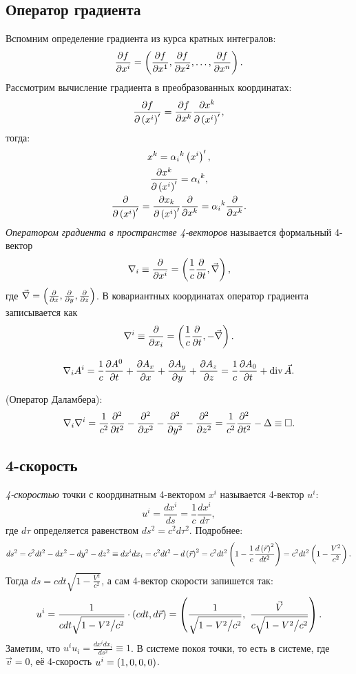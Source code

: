 \subsection{Оператор градиента}
    Вспомним определение градиента из курса кратных интегралов:
    \[
        \frac{\partial f}{\partial x^i} = \left({\frac{\partial f}{\partial x^1}, \frac{\partial f}{\partial x^2}, \ldots, \frac{\partial f}{\partial x^n}}\right).
    \]
    Рассмотрим вычисление градиента в преобразованных координатах:
    \[
        \frac{\partial f}{\partial\left({x^{i}}\right)'} = \frac{\partial f}{\partial x^k}\frac{\partial x^k}{\partial\left({x^{i}}\right)'},
    \]
    тогда:
    \begin{gather*}
        x^k = {\alpha_i}^k \left({x^{i}}\right)',\\
        \frac{\partial x^k}{\partial\left({x^{i}}\right)'} = {\alpha_i}^k,\\
        \frac{\partial}{\partial\left({x^{i}}\right)'} = \frac{\partial x_k}{\partial\left({x^{i}}\right)'} \frac{\partial}{\partial x^k} = {\alpha_i}^k \frac{\partial}{\partial x^k}.
    \end{gather*}
    \textit{Оператором градиента в пространстве 4-векторов} называется формальный 4-вектор
    \[
        \nabla_i \equiv \frac{\partial}{\partial x^i} = \left({\frac{1}{c}\frac{\partial}{\partial t}, \vec \nabla}\right),
    \]
    где $\vec \nabla = \left({\frac{\partial}{\partial x}, \frac{\partial}{\partial y}, \frac{\partial}{\partial z}}\right)$. В ковариантных координатах оператор градиента записывается как
    \[
        \nabla^i \equiv \frac{\partial}{\partial x_i} = \left({\frac{1}{c} \frac{\partial}{\partial t}, - \vec\nabla}\right).
    \]
    \begin{example}
        \[
            \nabla_i A^i = \frac{1}{c} \frac{\partial A^0}{\partial t} + \frac{\partial A_x}{\partial x} + \frac{\partial A_y}{\partial y} + \frac{\partial A_z}{\partial z} = \frac{1}{c} \frac{\partial A_0}{\partial t} + \operatorname{div} \vec A.
        \]
    \end{example}
    \begin{example} (Оператор Даламбера):
        \[
            \nabla_i \nabla^i = \frac{1}{c^2} \frac{\partial^2}{\partial{t}^2} - \frac{\partial^2}{\partial{x}^2} - \frac{\partial^2}{\partial{y}^2} - \frac{\partial^2}{\partial{z}^2} = \frac{1}{c^2} \frac{\partial^2}{\partial{t}^2} - \Delta \equiv \Box.
        \]
    \end{example}

\subsection{4-скорость}
    \textit{4-скоростью} точки с координатным 4-вектором $x^i$ называется 4-вектор $u^i$:
    \[
        u^i = \frac{dx^i}{ds} = \frac{1}{c} \frac{dx^i}{d\tau},
    \]
    где $d\tau$ определяется равенством $ds^2 = c^2 d\tau^2$. Подробнее:
    \[
        ds^2 = c^2dt^2 - dx^2 -dy^2 -dz^2 \equiv dx^i dx_i = c^2dt^2 - d\left({\vec r}\right)^2 = c^2 dt^2 \left({1 - \frac{1}{c} \frac{d\left({\vec r}\right)^2}{dt^2}}\right) =
        c^2 dt^2 \left({1 - \frac{V^2}{c^2}}\right).
    \]
    Тогда $\displaystyle ds = cdt\sqrt{1 - \frac{V^2}{c^2}}$, а сам 4-вектор скорости запишется так:
    \[
        u^i = \frac{1}{cdt\sqrt{1 - V^2 \big/ c^2}} \cdot \left({cdt, d\vec r}\right) = \left({\frac{1}{\sqrt{1 - V^2 \big/ c^2}}, \  \frac{\vec V}{c\sqrt{1 - V^2 \big/ c^2}}}\right).
    \]
    Заметим, что $u^i u_i = \frac{dx^i dx_i}{ds^2} \equiv 1$. В системе покоя точки, то есть в системе,
    где $\vec{v} = 0$, её 4-скорость $u^i = \left({1, 0, 0, 0}\right)$.

